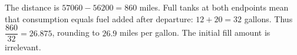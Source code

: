 The distance is $57060-56200=860$ miles. Full tanks at both endpoints mean that consumption equals fuel added after departure: $12+20=32$ gallons. Thus $\dfrac{860}{32}=26.875$, rounding to $\boxed{26.9}$ miles per gallon. The initial fill amount is irrelevant.
